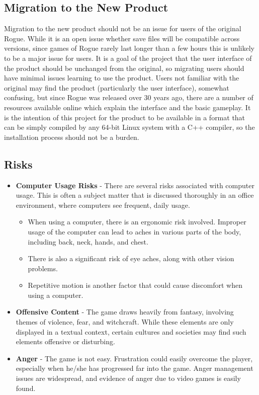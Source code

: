 \documentclass[12pt, titlepage]{article}
\begin{document}
	\subsection{Migration to the New Product}

		Migration to the new product should not be an issue for users of the original Rogue. While it is an open issue whether save files will be compatible across versions, since games of Rogue rarely last longer than a few hours this is unlikely to be a major issue for users. It is a goal of the project that the user interface of the product should be unchanged from the original, so migrating users should have minimal issues learning to use the product. Users not familiar with the original may find the product (particularly the user interface), somewhat confusing, but since Rogue was released over 30 years ago, there are a number of resources available online which explain the interface and the basic gameplay. It is the intention of this project for the product to be available in a format that can be simply compiled by any 64-bit Linux system with a C++ compiler, so the installation process should not be a burden.

	\subsection{Risks}

		\begin{itemize}
			\item \textbf{Computer Usage Risks} - There are several risks associated with computer usage. This is often a subject matter that is discussed thoroughly in an office environment, where computers see frequent, daily usage.
			\begin{itemize}
				\item When using a computer, there is an ergonomic risk involved. Improper usage of the computer can lead to aches in various parts of the body, including back, neck, hands, and chest.
				\item There is also a significant risk of eye aches, along with other vision problems.
				\item Repetitive motion is another factor that could cause discomfort when using a computer.
			\end{itemize}
			\item \textbf{Offensive Content} - The game draws heavily from fantasy, involving themes of violence, fear, and witchcraft. While these elements are only displayed in a textual context, certain cultures and societies may find such elements offensive or disturbing.
			\item \textbf{Anger} - The game is not easy. Frustration could easily overcome the player, especially when he/she has progressed far into the game. Anger management issues are widespread, and evidence of anger due to video games is easily found.
		\end{itemize}
\end{document}
